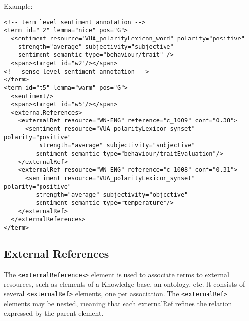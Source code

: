 Example:
\begin{Verbatim}[fontsize=\small]
<!-- term level sentiment annotation -->
<term id="t2" lemma="nice" pos="G">
  <sentiment resource="VUA_polarityLexicon_word" polarity="positive"
    strength="average" subjectivity="subjective"
    sentiment_semantic_type="behaviour/trait" />
  <span><target id="w2"/></span>
<!-- sense level sentiment annotation -->
</term>
<term id="t5" lemma="warm" pos="G">
  <sentiment/>
  <span><target id="w5"/></span>
  <externalReferences>
    <externalRef resource="WN-ENG" reference="c_1009" conf="0.38">
      <sentiment resource="VUA_polarityLexicon_synset" polarity="positive"
          strength="average" subjectivity="subjective"
         sentiment_semantic_type="behaviour/traitEvaluation"/>
    </externalRef>
    <externalRef resource="WN-ENG" reference="c_1008" conf="0.31">
      <sentiment resource="VUA_polarityLexicon_synset" polarity="positive"
         strength="average" subjectivity="objective"
         sentiment_semantic_type="temperature"/>
    </externalRef>
  </externalReferences>
</term>
\end{Verbatim}

\subsection{External References}
\label{sec:external-references}

The \texttt{<externalReferences>} element is used to associate terms to
external resources, such as elements of a Knowledge base, an ontology,
etc. It consists of several \texttt{<externalRef>} elements, one per
association. The \texttt{<externalRef>} elements may be nested, meaning that
each externalRef refines the relation expressed by the parent element.\\

